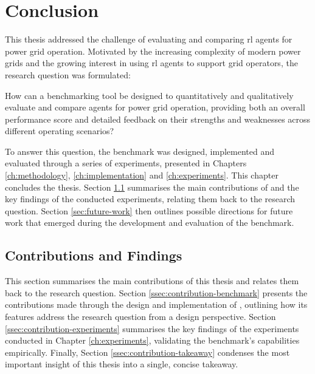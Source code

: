 \chapter{Conclusion}\label{ch:conclusion}
This thesis addressed the challenge of evaluating and comparing \ac{rl} agents for power grid operation. Motivated by the increasing complexity of modern power grids and the growing interest in using \ac{rl} agents to support grid operators, the research question was formulated: \begin{displayquote}
How can a benchmarking tool be designed to quantitatively and qualitatively evaluate and compare agents for power grid operation, providing both an overall performance score and detailed feedback on their strengths and weaknesses across different operating scenarios?
\end{displayquote}
To answer this question, the benchmark \benchmark was designed, implemented and evaluated through a series of experiments, presented in Chapters \ref{ch:methodology}, \ref{ch:implementation} and \ref{ch:experiments}. This chapter concludes the thesis. Section \ref{sec:contributions-findings} summarises the main contributions of \benchmark and the key findings of the conducted experiments, relating them back to the research question. Section \ref{sec:future-work} then outlines possible directions for future work that emerged during the development and evaluation of the benchmark.




\section{Contributions and Findings}\label{sec:contributions-findings}
This section summarises the main contributions of this thesis and relates them back to the research question. Section \ref{ssec:contribution-benchmark} presents the contributions made through the design and implementation of \benchmark, outlining how its features address the research question from a design perspective. Section \ref{ssec:contribution-experiments} summarises the key findings of the experiments conducted in Chapter \ref{ch:experiments}, validating the benchmark's capabilities empirically. Finally, Section \ref{ssec:contribution-takeaway} condenses the most important insight of this thesis into a single, concise takeaway.

